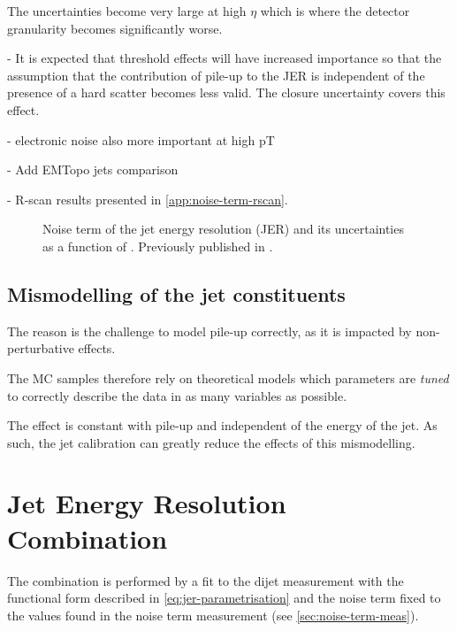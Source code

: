 The uncertainties become very large at high $\eta$ which is where the detector granularity becomes significantly worse.

- It is expected that threshold effects will have increased importance so that the assumption that the contribution of pile-up to the JER is independent of the presence of a hard scatter becomes less valid. The closure uncertainty covers this effect.

- electronic noise also more important at high pT

- Add EMTopo jets comparison

- R-scan results presented in \cref{app:noise-term-rscan}.


\begin{figure}
    \caption{Noise term of the jet energy resolution (JER) and its uncertainties as a function of \abseta. Previously published in .}
    \label{fig:noise-term-results-pflow}
\end{figure}


\subsection{Mismodelling of the jet constituents}
\label{subsec:constituents-mismodelling}
The reason is the challenge to model pile-up correctly, as it is impacted by non-perturbative effects.

 The MC samples therefore rely on theoretical models which parameters are \emph{tuned} to correctly describe the data in as many variables as possible.

The effect is constant with pile-up and independent of the energy of the jet. As such, the jet calibration can greatly reduce the effects of this mismodelling.



\section{Jet Energy Resolution Combination}

The combination is performed by a fit to the dijet measurement with the functional form described in \cref{eq:jer-parametrisation} and the noise term fixed to the values found in the noise term measurement (see \cref{sec:noise-term-meas}).

